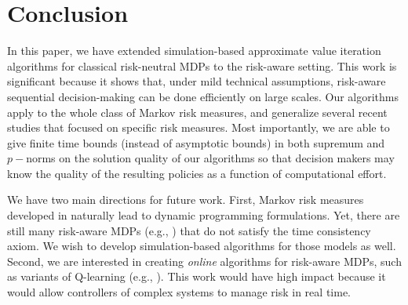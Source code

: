 \documentclass[12pt,technote,onecolumn]{IEEEtran}
\begin{document}




\section{Conclusion}\label{sec8}
In this paper, we have extended simulation-based approximate value
iteration algorithms for classical risk-neutral MDPs to the risk-aware
setting. This work is significant because it shows that, under mild
technical assumptions, risk-aware sequential decision-making can be
done efficiently on large scales. Our algorithms apply to the whole class of Markov risk measures, and generalize several recent studies that focused on specific risk measures. Most importantly, we are able to
give finite time bounds (instead of asymptotic bounds) in both supremum and $p-$norms on the solution
quality of our algorithms so that decision makers may know the quality
of the resulting policies as a function of computational effort. 

We have two main directions for future work. First, Markov
risk measures developed in \cite{ruszczynski2010risk}  naturally lead to dynamic programming formulations. Yet, there
are still many risk-aware MDPs (e.g., \cite{bauerle2013more})
that do not satisfy the time consistency axiom. We wish to develop simulation-based algorithms for those models as well. Second,
we are interested in creating \emph{online} algorithms for risk-aware
MDPs, such as variants of Q-learning (e.g., \cite{bertsekas1996neuro}).
This work would have high impact because it would allow controllers
of complex systems to manage risk in real time.





% 
\end{document}

